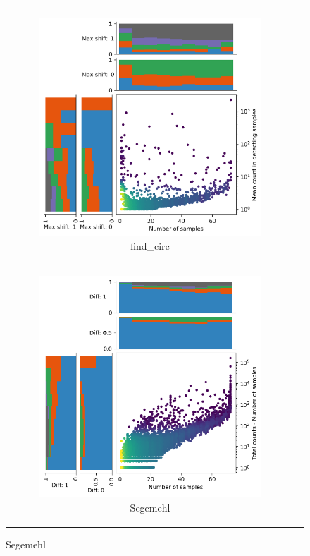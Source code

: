 \begin{figure}[ht]
\begin{tabular}{cc}
\begin{subfigure}{.4\textwidth}
                       \includegraphics[width=\linewidth]{chapters/4_results_and_discussion/figures/detection/density/find_circ.png}
                       \caption{find\_circ} \label{fig:detection_density_find-circ} \end{subfigure}
               \\ \begin{subfigure}{.4\textwidth} \centering

            \includegraphics[width=\linewidth]{chapters/4_results_and_discussion/figures/detection/density/segemehl.png}
            \caption{Segemehl} \label{fig:detection_density_segemehl} \end{subfigure}


\end{tabular}
\end{figure}

